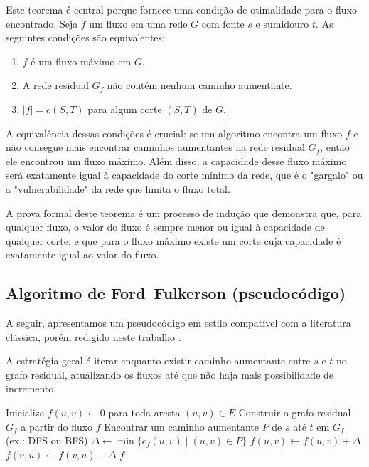 \documentclass[12pt]{article}
\begin{document}
\noindent Este teorema é central porque fornece uma condição de otimalidade para o fluxo encontrado. Seja $f$ um fluxo em uma rede $G$ com fonte $s$ e sumidouro $t$. As seguintes condições são equivalentes:

\begin{enumerate}
    \item $f$ é um fluxo máximo em $G$.
    \item A rede residual $G_f$ não contém nenhum caminho aumentante.
    \item $|f| = c(S, T)$ para algum corte $(S, T)$ de $G$.
\end{enumerate}

\noindent A equivalência dessas condições é crucial: se um algoritmo encontra um fluxo $f$ e não consegue mais encontrar caminhos aumentantes na rede residual $G_f$, então ele encontrou um fluxo máximo. Além disso, a capacidade desse fluxo máximo será exatamente igual à capacidade do corte mínimo da rede, que é o "gargalo" ou a "vulnerabilidade" da rede que limita o fluxo total. 

\noindent A prova formal deste teorema é um processo de indução que demonstra que, para qualquer fluxo, o valor do fluxo é sempre menor ou igual à capacidade de qualquer corte, e que para o fluxo máximo existe um corte cuja capacidade é exatamente igual ao valor do fluxo.

\newpage
\subsection{Algoritmo de Ford–Fulkerson (pseudocódigo)} 

A seguir, apresentamos um pseudocódigo em estilo compatível com a literatura clássica, porém redigido neste trabalho \cite{cormen2009,ahuja1993,kleinberg2006}. 

A estratégia geral é iterar enquanto existir caminho aumentante entre $s$ e $t$ no grafo residual, atualizando os fluxos até que não haja mais possibilidade de incremento.

\begin{algorithm}[H]
\caption{Algoritmo de Ford–Fulkerson}
\label{alg:ford_fulkerson}
\begin{algorithmic}[1]
    \State Inicialize $f(u,v) \gets 0$ para toda aresta $(u,v) \in E$
        \State Construir o grafo residual $G_f$ a partir do fluxo $f$
        \State Encontrar um caminho aumentante $P$ de $s$ até $t$ em $G_f$ (ex.: DFS ou BFS)
        \State $\Delta \gets \min\{c_f(u,v) \mid (u,v) \in P\}$ 
            \State $f(u,v) \gets f(u,v) + \Delta$ 
            \State $f(v,u) \gets f(v,u) - \Delta$ 
        \EndFor
    \EndWhile
    \State \Return $f$ 
\EndProcedure
\end{algorithmic}
\end{algorithm}
\end{document}
